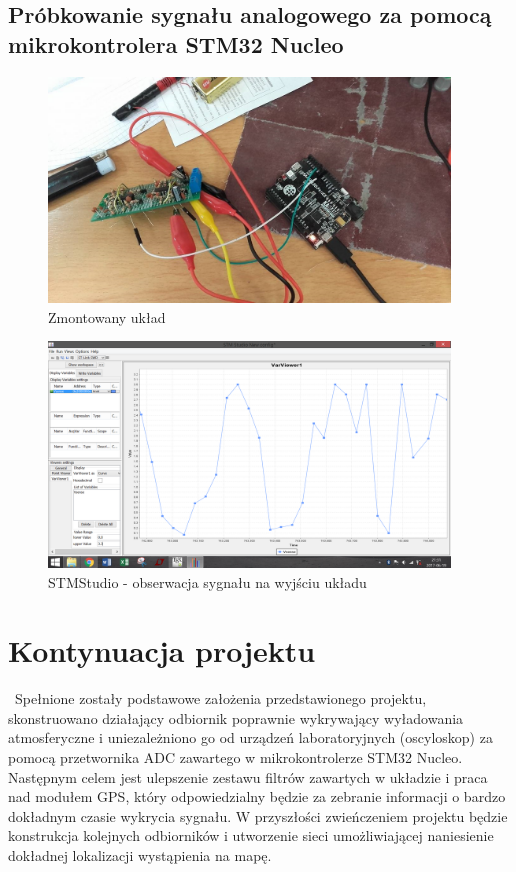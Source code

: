 \documentclass[12pt]{article}
\begin{document}
\subsection{Próbkowanie sygnału analogowego za pomocą mikrokontrolera STM32 Nucleo}
\begin{figure}[H]
\begin{center}
\includegraphics[width=0.95\textwidth]{figures/uklad.png}
\caption{Zmontowany układ}
\end{center}
\end{figure}
\begin{figure}[H]
\begin{center}
\includegraphics[width=0.95\textwidth]{figures/stm.png}
\caption{STMStudio - obserwacja sygnału na wyjściu układu}
\end{center}
\end{figure}
\begin{landscape}
\centering

\end{landscape}

\section{Kontynuacja projektu}
\ Spełnione zostały podstawowe założenia przedstawionego projektu, skonstruowano działający odbiornik poprawnie wykrywający wyładowania atmosferyczne i uniezależniono go od urządzeń laboratoryjnych (oscyloskop) za pomocą przetwornika ADC zawartego w mikrokontrolerze STM32 Nucleo. Następnym celem jest ulepszenie zestawu filtrów zawartych w układzie i praca nad modułem GPS, który odpowiedzialny będzie za zebranie informacji o bardzo dokładnym czasie wykrycia sygnału. W przyszłości zwieńczeniem projektu będzie konstrukcja kolejnych odbiorników i utworzenie sieci umożliwiającej naniesienie dokładnej lokalizacji wystąpienia na mapę. 
\end{document}

